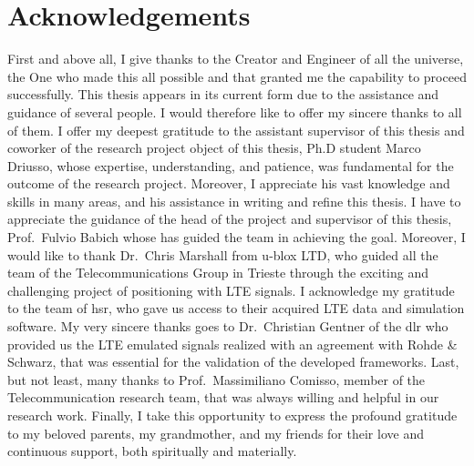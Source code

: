 \chapter*{Acknowledgements}
\label{chap:ack}

\vspace{4ex}
First and above all, I give thanks to the Creator and Engineer of all the universe, the One who made 
this all possible and that granted me the capability to proceed successfully. 
This thesis appears in its current form due to the assistance and guidance of several people. 
I would therefore like to offer my sincere thanks to all of them.
I offer my deepest gratitude to the assistant supervisor of this thesis and
coworker of the research project object of this thesis, Ph.D student Marco Driusso, whose expertise, 
understanding, and patience, was fundamental for the outcome of the research project. Moreover, I appreciate 
his vast knowledge and skills in many areas, and his assistance  in writing and refine this thesis.
I have to appreciate the guidance of the head of the project and supervisor of this thesis, Prof.~Fulvio 
Babich whose has guided the team in achieving the goal. 
Moreover, I would like to thank Dr.~Chris Marshall from u-blox LTD, who guided all the team of the 
Telecommunications Group in Trieste through the exciting and challenging project of positioning with 
LTE signals.
I acknowledge my gratitude to the team of \acrfull{hsr}, who gave us access to their acquired LTE data 
and simulation software.  
My very sincere thanks goes to Dr.~Christian Gentner of the \acrfull{dlr} who provided us the LTE 
emulated signals realized with an agreement with Rohde \& Schwarz, that was essential for 
the validation of the developed frameworks.
Last, but not least, many thanks to Prof.~Massimiliano Comisso, member of the Telecommunication research team,  
that was always willing and helpful in our research work.
Finally, I take this opportunity to express the profound gratitude to my beloved parents, 
my grandmother, and my friends for their love and continuous support, both spiritually and materially.